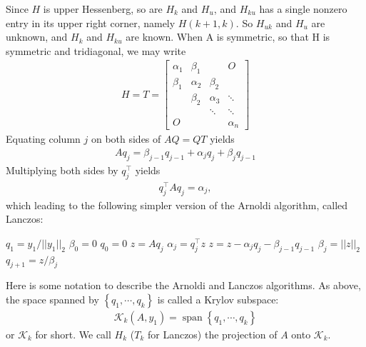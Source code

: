 \documentclass[11pt]{article}
\numberwithin{equation}{section}
\begin{document}
Since $H$ is upper Hessenberg, so are $H_k$ and $H_u$, and $H_{ku}$ has a single nonzero entry in its upper right corner, namely $H(k+1,k)$.
So $H_{uk}$ and $H_u$ are unknown, and $H_k$ and $H_{ku}$ are known. When A is symmetric, so that H is symmetric and tridiagonal, we may write \begin{align*}
    H=T=\begin{bmatrix}
        \alpha_1 & \beta_1 &  & O \\ 
        \beta_1 & \alpha_2 & \beta_2 & \\ 
        & \beta_2 & \alpha_3 & \ddots \\ 
        &  & \ddots & \ddots \\ 
        O &  &  & \alpha_n
       \end{bmatrix}
\end{align*}
Equating column $j$ on both sides of $AQ = QT$ yields
\begin{align*}
    Aq_j = \beta_{j-1}q_{j-1} + \alpha_j q_j + \beta_j q_{j-1}
\end{align*}
Multiplying both sides by $q_j^\top$ yields \begin{align*}
    q_j^\top A q_j = \alpha_j,
\end{align*}
which leading to the following simpler version of the Arnoldi algorithm, called Lanczos:
\begin{algorithmfrm}[Lanczos algorithm for (partial) reduction of $A=A^\top$ to tridiagonal form]
    \begin{algorithmic}
        \State $q_1 = y_1 / ||y_1||_2$
        \State $\beta_0=0$
        \State $q_0=0$
            \State $z = Aq_j$
            \State $\alpha_j = q_j^\top z$
            \State $z = z - \alpha_j q_j - \beta_{j-1}q_{j-1}$
            \State $\beta_j = ||z||_2$
            \State $q_{j+1} = z / \beta_j$
        \EndFor
    \end{algorithmic}
\end{algorithmfrm}
Here is some notation to describe the Arnoldi and Lanczos algorithms. As above, the space spanned by $\left\{ q_1,\cdots,q_k \right\}$ is called a Krylov subspace:
\begin{align*}
    \mathcal{K}_k (A,y_1) = \operatorname{span}\left\{ q_1,\cdots,q_k \right\}
\end{align*}
or $\mathcal{K}_k$ for short. We call $H_k$ ($T_k$ for Lanczos) the projection of $A$ onto $\mathcal{K}_k$.
\end{document}
